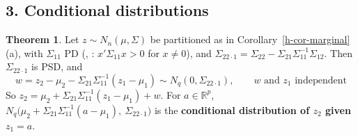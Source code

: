 \documentclass[12pt]{article}
\newcommand{\R}{\mathbb R}
\theoremstyle{definition}
\newtheorem{theorem}{Theorem}
\begin{document}
\subsection*{3. Conditional distributions}

\begin{theorem}\label{h-thm-conditional}
Let \(z\sim N_n(\mu,\Sigma)\) be partitioned as in Corollary~\ref{h-cor-marginal}(a), with \(\Sigma_{11}\) PD (,
: \(x'\Sigma_{11}x>0\) for \(x\ne0\)), and \(\Sigma_{22\cdot1}=\Sigma_{22}-\Sigma_{21}\Sigma_{11}^{-1}\Sigma_{12}\).
Then \(\Sigma_{22\cdot1}\) is PSD, and
\[
w=z_2-\mu_2-\Sigma_{21}\Sigma_{11}^{-1}(z_1-\mu_1)\sim N_q(0,\Sigma_{22\cdot1}),\qquad w\text{ and }z_1\text{ independent}
\]
So \(z_2=\mu_2+\Sigma_{21}\Sigma_{11}^{-1}(z_1-\mu_1)+w\). For \(a\in\R^p\),
\(N_q\bigl(\mu_2+\Sigma_{21}\Sigma_{11}^{-1}(a-\mu_1),\ \Sigma_{22\cdot1}\bigr)\) is the \textbf{conditional
distribution of \(z_2\) given \(z_1=a\)}.
\end{theorem}
\end{document}
